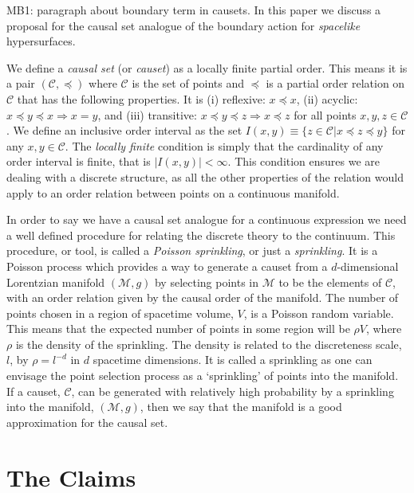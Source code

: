 \documentclass[12pt]{article}
\begin{document}
MB1: paragraph about boundary term in causets. In this paper we discuss a proposal for the  causal set analogue of the boundary action for \emph{spacelike} hypersurfaces. 

We define a \textit{causal set} (or \textit{causet}) as a locally finite partial order. This means it is a pair $(\mathcal{C},\preceq)$ where $\mathcal{C}$ is the set of points and $\preceq$ is a partial order relation on $\mathcal{C}$ that has the following properties. It is (i) reflexive: $x\preceq x$, (ii) acyclic: $x\preceq y\preceq x \Rightarrow x=y$, and (iii) transitive: $x\preceq y\preceq z \Rightarrow x\preceq z$ for all points $x, y, z \in \mathcal{C}$. We define an inclusive order interval as the set $I(x,y)\equiv \lbrace z\in\mathcal{C}|x\preceq z\preceq y\rbrace$ for any $x, y\in\mathcal{C}$. The \textit{locally finite} condition is simply that the cardinality of any order interval is finite, that is $|I(x,y)|<\infty$. This condition ensures we are dealing with a discrete structure, as all the other properties of the relation would apply to an order relation between points on a continuous manifold.

In order to say we have a causal set analogue for a continuous expression we need a well defined procedure for relating the discrete theory to the continuum. This procedure, or tool, is called a \textit{Poisson sprinkling}, or just a \textit{sprinkling}. It is a Poisson process which provides a way to generate a causet from a $d$-dimensional Lorentzian manifold $(\mathcal{M},g)$ by selecting points in $\mathcal{M}$ to be the elements of $\mathcal{C}$, with an order relation given by the causal order of the manifold. The number of points chosen in a region of spacetime volume, $V$, is a Poisson random variable. This means that the expected number of points in some region will be $\rho V$, where $\rho$ is the density of the sprinkling. The density is related to the discreteness scale, $l$, by $\rho=l^{-d}$ in $d$ spacetime dimensions. It is called a sprinkling as one can envisage the point selection process as a `sprinkling' of points into the manifold. If a causet, $\mathcal{C}$, can be generated with relatively high probability by a sprinkling into the manifold, $(\mathcal{M},g)$, then we say that the manifold is a good approximation for the causal set.

\section{The Claims}
\end{document}
